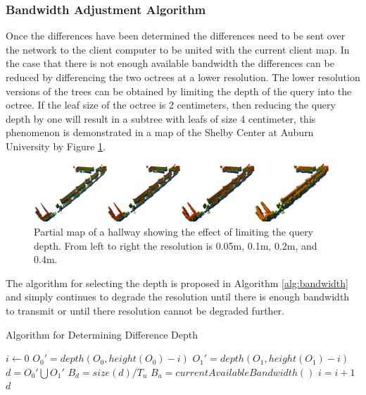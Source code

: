 \documentclass[12pt]{report}
\begin{document}
\subsubsection{Bandwidth Adjustment Algorithm}
Once the differences have been determined the differences need to be sent over the network to the client computer to be united with the current client map. In the case that there is not enough available bandwidth the differences can be reduced by differencing the two octrees at a lower resolution. The lower resolution versions of the trees can be obtained by limiting the depth of the query into the octree. If the leaf size of the octree is 2 centimeters, then reducing the query depth by one will result in a subtree with leafs of size 4 centimeter, this phenomenon is demonstrated in a map of the Shelby Center at Auburn University by Figure \ref{fig:treedepth}.

\begin{figure}[!ht]
  \centering
  \includegraphics[width=6.5in,keepaspectratio]{ShelbySE_2f_combined_octovis.png}
  \caption{Partial map of a hallway showing the effect of limiting the query 
           depth.  From left to right the resolution is 0.05m, 0.1m, 0.2m,
           and 0.4m.}
  \label{fig:treedepth}
\end{figure}

The algorithm for selecting the depth is proposed in Algorithm \ref{alg:bandwidth} and simply continues to degrade the resolution until there is enough bandwidth to transmit or until there resolution cannot be degraded further.

\begin{algorithm}
\caption{Algorithm for Determining Difference Depth}
\label{alg:bandwidth}
\begin{algorithmic}
  \STATE {}
  \STATE {}
  \STATE {}
  \STATE {}
  \STATE {}
  \STATE {}
  \STATE {}
  \STATE $i\gets 0$
  \REPEAT
    \STATE $O_0 \prime = depth(O_0,height(O_0)-i)$
    \STATE $O_1 \prime = depth(O_1,height(O_1)-i)$
    \STATE $d = O_0 \prime \bigcup O_1 \prime $
    \STATE $B_d = size(d) / T_u$
    \STATE $B_a = currentAvailableBandwidth()$
    \STATE $i = i + 1$
  \RETURN $d$
\end{algorithmic}
\end{algorithm}
\end{document}
